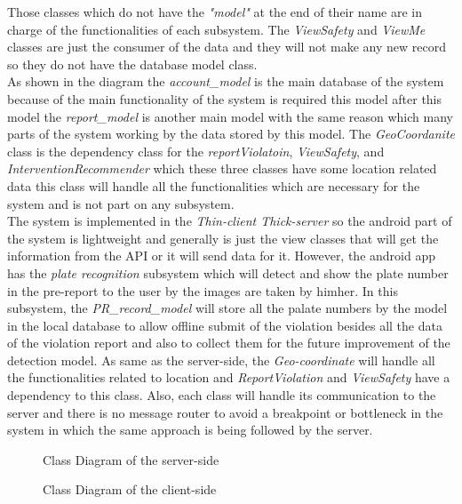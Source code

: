 Those classes which do not have the  \emph{"model"} at the end of their name are in charge of the functionalities of each subsystem. The  \emph{ViewSafety} and  \emph{ViewMe} classes are just the consumer of the data and they will not make any new record so they do not have the database model class.\\
As shown in the diagram the  \emph{account\_model} is the main database of the system because of the main functionality of the system is required this model after this model the  \emph{report\_model} is another main model with the same reason which many parts of the system working by the data stored by this model. The  \emph{GeoCoordanite} class is the dependency class for the  \emph{reportViolatoin},  \emph{ViewSafety}, and  \emph{InterventionRecommender} which these three classes have some location related data this class will handle all the functionalities which are necessary for the system and is not part on any subsystem.\\
The system is implemented in the  \emph{Thin-client\/ Thick-server} so the android part of the system is lightweight and generally is just the view classes that will get the information from the API or it will send data for it. However, the android app has the  \emph{plate recognition} subsystem which will detect and show the plate number in the pre-report to the user by the images are taken by him\/her.  In this subsystem, the  \emph{PR\_record\_model} will store all the palate numbers by the model in the local database to allow offline submit of the violation besides all the data of the violation report and also to collect them for the future improvement of the detection model. As same as the server-side, the  \emph{Geo-coordinate} will handle all the functionalities related to location and  \emph{ReportViolation} and  \emph{ViewSafety} have a dependency to this class. Also, each class will handle its communication to the server and there is no message router to avoid a breakpoint or bottleneck in the system in which the same approach is being followed by the server.\\


\begin{sidewaysfigure}
\begin{figure}[H]
\caption{Class Diagram of the server-side}
\label{fig:Class-server}
\centering

\end{figure}
\end{sidewaysfigure}

\begin{sidewaysfigure}
\begin{figure}[H]
\caption{Class Diagram of the client-side}
\label{fig:Class-client}
\centering

\end{figure}
\end{sidewaysfigure}
